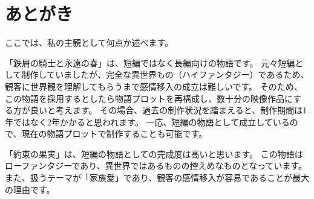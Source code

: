 \chapter{あとがき}

ここでは、私の主観として何点か述べます。

「鉄屑の騎士と永遠の春」は、短編ではなく長編向けの物語です。
元々短編として制作していましたが、完全な異世界もの（ハイファンタジー）であるため、観客に世界観を理解してもらうまで感情移入の成立は難しいです。
そのため、この物語を採用するとしたら物語プロットを再構成し、数十分の映像作品にする方が良いと考えます。
その場合、過去の制作状況を踏まえると、制作期間は1年ではなく2年かかると思われます。
一応、短編の物語として成立しているので、現在の物語プロットで制作することも可能です。

「約束の果実」は、短編の物語としての完成度は高いと思います。
この物語はローファンタジーであり、異世界ではあるものの控えめなものとなっています。
また、扱うテーマが「家族愛」であり、観客の感情移入が容易であることが最大の理由です。

